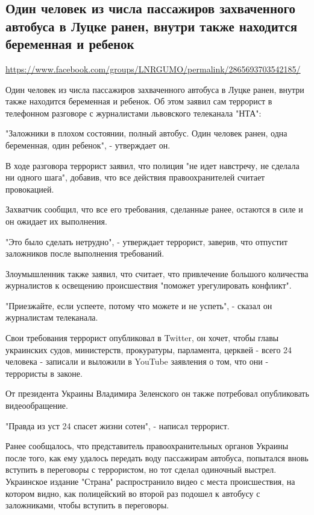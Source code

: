  
 
\subsection{Один человек из числа пассажиров захваченного автобуса в Луцке ранен, внутри также находится беременная и ребенок}
\label{sec:21_07_2020.fb.lnr.4}
\url{https://www.facebook.com/groups/LNRGUMO/permalink/2865693703542185/}

  
Один человек из числа пассажиров захваченного автобуса в Луцке ранен, внутри
также находится беременная и ребенок.  Об этом заявил сам террорист в
телефонном разговоре с журналистами львовского телеканала "НТА":

"Заложники в плохом состоянии, полный автобус.  Один человек ранен, одна
беременная, один ребенок", - утверждает он.

В ходе разговора террорист заявил, что полиция "не идет навстречу, не сделала
ни одного шага", добавив, что все действия правоохранителей считает
провокацией.

Захватчик сообщил, что все его требования, сделанные ранее, остаются в силе и
он ожидает их выполнения.

"Это было сделать нетрудно", - утверждает террорист, заверив, что отпустит
заложников после выполнения требований.

Злоумышленник также заявил, что считает, что привлечение большого количества
журналистов к освещению происшествия "поможет урегулировать конфликт".

"Приезжайте, если успеете, потому что можете и не успеть", - сказал он
журналистам телеканала.

Свои требования террорист опубликовал в Twitter, он хочет, чтобы главы
украинских судов, министерств, прокуратуры, парламента, церквей - всего 24
человека - записали и выложили в YouTube заявления о том, что они - террористы
в законе.

От президента Украины Владимира Зеленского он также потребовал опубликовать
видеообращение.

"Правда из уст 24 спасет жизни сотен", - написал террорист.

Ранее сообщалось, что представитель правоохранительных органов Украины после
того, как ему удалось передать воду пассажирам автобуса, попытался вновь
вступить в переговоры с террористом, но тот сделал одиночный выстрел.
Украинское издание "Страна" распространило видео с места происшествия, на
котором видно, как полицейский во второй раз подошел к автобусу с заложниками,
чтобы вступить в переговоры.

